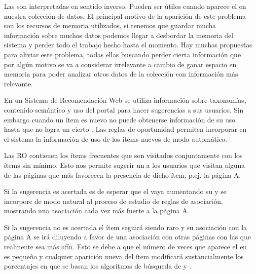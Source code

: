 \ABIERTO

Las \ROPs son \ARs interpretadas en sentido inverso. Pueden ser útiles cuando aparece el \dilemaIR en nuestra colección de datos. El principal motivo de la aparición de este problema son los recursos de memoria utilizados, si tenemos que guardar mucha información sobre muchos datos podemos llegar a desbordar la memoria del sistema y perder todo el trabajo hecho hasta el momento. Hay muchas propuestas para aliviar este problema, todas ellas buscando perder cierta información que por algún motivo se va a considerar irrelevante a cambio de ganar espacio en memoria para poder analizar otros datos de la colección con información más relevante.
























En un Sistema de Recomendación Web se utiliza
información sobre taxonomías, contenido
semántico y uso del portal para hacer sugerencias
a sus usuarios. Sin embargo cuando un ítem es
nuevo no puede obtenerse información de su uso
hasta que no logra un cierto \soporte. Las reglas de
oportunidad permiten incorporar en el sistema la
información de uso de los ítems nuevos de modo
automático.

Las RO contienen los ítems frecuentes que son
visitados conjuntamente con los ítems sin \soporte
mínimo. Esto nos permite sugerir un \ir a
los usuarios que visitan alguna de las páginas que
más favorecen la presencia de dicho ítem, p.ej. la
página A.

Si la sugerencia es acertada es de esperar que el
\ir vaya aumentando su \soporte y se incorpore
de modo natural al proceso de estudio de
reglas de asociación, mostrando una asociación
cada vez más fuerte a la página A.

Si la sugerencia no es acertada el ítem seguirá
siendo raro y su asociación con la página A se irá
diluyendo a favor de una asociación con otras
páginas con las que realmente sea más afín. Esto
se debe a que el número de veces que aparece el
\ir en \D es pequeño y cualquier aparición
nueva del ítem modificará sustancialmente los
porcentajes en que se basan los algoritmos de
búsqueda de \ARs y \ROPs.